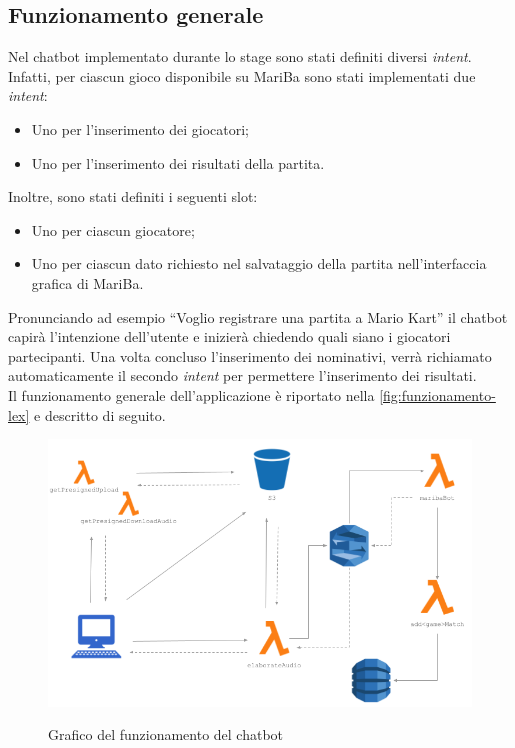 	\subsection{Funzionamento generale}
	
	\noindent Nel \gls{chatbot} implementato durante lo stage sono stati definiti diversi \emph{intent}. Infatti, per ciascun gioco disponibile su MariBa sono stati implementati due \emph{intent}:
	\begin{itemize}
		\item Uno per l'inserimento dei giocatori;
		\item Uno per l'inserimento dei risultati della partita.
	\end{itemize}
	Inoltre, sono stati definiti i seguenti slot:
	\begin{itemize}
		\item Uno per ciascun giocatore;
		\item Uno per ciascun dato richiesto nel salvataggio della partita nell'interfaccia grafica di MariBa.
	\end{itemize}
	
	\noindent Pronunciando ad esempio ``Voglio registrare una partita a Mario Kart'' il \gls{chatbot} capirà l'intenzione
	dell'utente e inizierà chiedendo quali siano i giocatori partecipanti. Una volta concluso l'inserimento dei
	nominativi, verrà richiamato automaticamente il secondo \emph{intent} per permettere l'inserimento dei risultati. \\
	
	\noindent Il funzionamento generale dell'applicazione è riportato nella \autoref{fig:funzionamento-lex} e descritto di seguito.
	
	\begin{figure}[H]
		\centering
		\includegraphics[width=12cm]{immagini/funzionamentoLex.png} \\
		\caption{\label{fig:funzionamento-lex} Grafico del funzionamento del chatbot}
	\end{figure}

